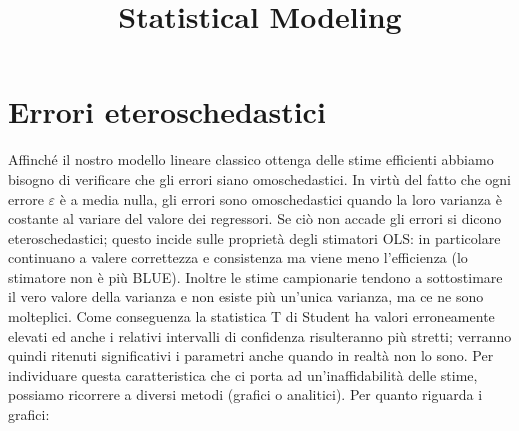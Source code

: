 \documentclass[a4page, 11pt]{article}
\title{Statistical Modeling}
\author{}
\date{}
\begin{document}
\maketitle

\section{Errori eteroschedastici}

Affinché il nostro modello lineare classico ottenga delle stime efficienti abbiamo bisogno di verificare che gli errori siano omoschedastici.
In virtù del fatto che ogni errore $\varepsilon$ è a media nulla, gli errori sono omoschedastici quando la loro varianza è costante al variare del valore dei regressori.
Se ciò non accade gli errori si dicono eteroschedastici; questo incide sulle proprietà degli stimatori OLS: in particolare continuano a valere correttezza e consistenza ma viene meno l’efficienza (lo stimatore non è più BLUE). Inoltre le stime campionarie tendono a sottostimare il vero valore della varianza e non esiste più un’unica varianza, ma ce ne sono molteplici. Come conseguenza la statistica T di Student ha valori erroneamente elevati ed anche i relativi intervalli di confidenza risulteranno più stretti; verranno quindi ritenuti significativi i parametri anche quando in realtà non lo sono. 
Per individuare questa caratteristica che ci porta ad un’inaffidabilità delle stime, possiamo ricorrere a diversi metodi (grafici o analitici).
\newline
\newline
Per quanto riguarda i grafici:
\end{document}
